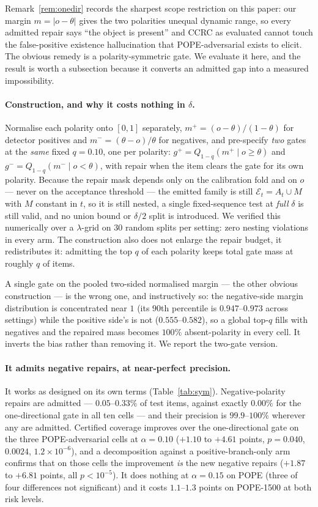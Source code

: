 \documentclass{article}
\theoremstyle{plain}
\theoremstyle{definition}
\theoremstyle{remark}
\newcommand{\emit}{\mathcal{E}}
\begin{document}
Remark~\ref{rem:onedir} records the sharpest scope restriction on this paper: our margin
$m=|o-\theta|$ gives the two polarities unequal dynamic range, so every admitted repair says
``the object is present'' and CCRC as evaluated cannot touch the false-positive existence
hallucination that POPE-adversarial exists to elicit. The obvious remedy is a polarity-symmetric
gate. We evaluate it here, and the result is worth a subsection because it converts an admitted
gap into a measured impossibility.

\paragraph{Construction, and why it costs nothing in $\delta$.}
Normalise each polarity onto $[0,1]$ separately, $m^+=(o-\theta)/(1-\theta)$ for detector
positives and $m^-=(\theta-o)/\theta$ for negatives, and pre-specify \emph{two} gates at the
\emph{same} fixed $q=0.10$, one per polarity:
$g^+=Q_{1-q}(m^+\mid o\ge\theta)$ and $g^-=Q_{1-q}(m^-\mid o<\theta)$, with repair when the
item clears the gate for its own polarity. Because the repair mask depends only on the
calibration fold and on $o$ --- never on the acceptance threshold --- the emitted family is
still $\emit_t=A_t\cup M$ with $M$ constant in $t$, so it is still nested, a single
fixed-sequence test at \emph{full} $\delta$ is still valid, and no union bound or $\delta/2$
split is introduced. We verified this numerically over a $\lambda$-grid on $30$ random splits
per setting: zero nesting violations in every arm. The construction also does not enlarge the
repair budget, it redistributes it: admitting the top $q$ of each polarity keeps total gate mass
at roughly $q$ of items.

A single gate on the pooled two-sided normalised margin --- the other obvious construction ---
is the wrong one, and instructively so: the negative-side margin distribution is concentrated
near $1$ (its $90$th percentile is $0.947$--$0.973$ across settings) while the positive side's is
not ($0.555$--$0.582$), so a global top-$q$ fills with negatives and the repaired mass becomes
$100\%$ absent-polarity in every cell. It inverts the bias rather than removing it. We report the
two-gate version.

\paragraph{It admits negative repairs, at near-perfect precision.}
It works as designed on its own terms (Table~\ref{tab:sym}). Negative-polarity repairs are
admitted --- $0.05$--$0.33\%$ of test items, against exactly $0.00\%$ for the one-directional
gate in all ten cells --- and their precision is $99.9$--$100\%$ wherever any are admitted.
Certified coverage improves over the one-directional gate on the three POPE-adversarial cells at
$\alpha=0.10$ ($+1.10$ to $+4.61$ points, $p=0.040$, $0.0024$, $1.2\times10^{-6}$), and a
decomposition against a positive-branch-only arm confirms that on those cells the improvement
\emph{is} the new negative repairs ($+1.87$ to $+6.81$ points, all $p<10^{-5}$). It does nothing
at $\alpha=0.15$ on POPE (three of four differences not significant) and it costs $1.1$--$1.3$
points on POPE-1500 at both risk levels.
\end{document}

